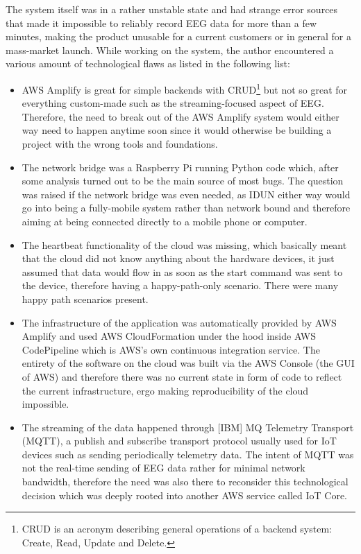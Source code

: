 The system itself was in a rather unstable state and had strange error sources that made it impossible to reliably record EEG data for more than a few minutes, making the product unusable for a current customers or in general for a mass-market launch. While working on the system, the author encountered a various amount of technological flaws as listed in the following list:

\begin{itemize}
  \item AWS Amplify is great for simple backends with CRUD\footnote{CRUD is an acronym describing general operations of a backend system: Create, Read, Update and Delete.} but not so great for everything custom-made such as the streaming-focused aspect of EEG. Therefore, the need to break out of the AWS Amplify system would either way need to happen anytime soon since it would otherwise be building a project with the wrong tools and foundations.
  \item The network bridge was a Raspberry Pi running Python code which, after some analysis turned out to be the main source of most bugs. The question was raised if the network bridge was even needed, as IDUN either way would go into being a fully-mobile system rather than network bound and therefore aiming at being connected directly to a mobile phone or computer.
  \item The heartbeat functionality of the cloud was missing, which basically meant that the cloud did not know anything about the hardware devices, it just assumed that data would flow in as soon as the start command was sent to the device, therefore having a happy-path-only scenario. There were many happy path scenarios present.
   \item The infrastructure of the application was automatically provided by AWS Amplify and used AWS CloudFormation under the hood inside AWS CodePipeline which is AWS's own continuous integration service. The entirety of the software on the cloud was built via the AWS Console (the GUI of AWS) and therefore there was no current state in form of code to reflect the current infrastructure, ergo making reproducibility of the cloud impossible.
   \item The streaming of the data happened through [IBM] MQ Telemetry Transport (MQTT), a publish and subscribe transport protocol usually used for IoT devices such as sending periodically telemetry data. The intent of MQTT was not the real-time sending of EEG data rather for minimal network bandwidth, therefore the need was also there to reconsider this technological decision which was deeply rooted into another AWS service called IoT Core.

\end{itemize}
